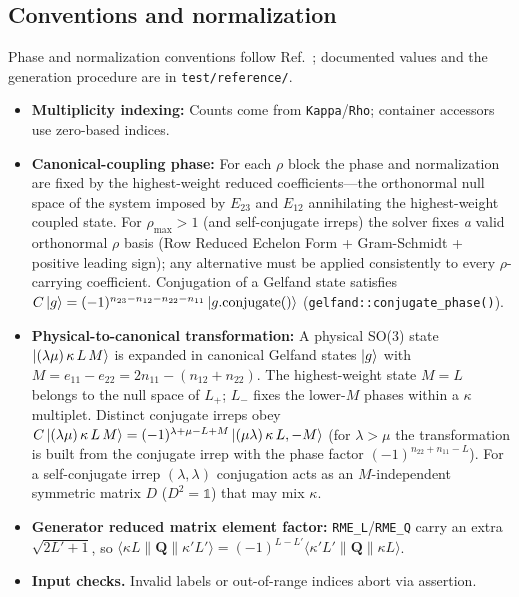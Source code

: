 \documentclass[aps,onecolumn,10pt,superscriptaddress,floatfix,nofootinbib]{revtex4}
\begin{document}
\subsection{Conventions and normalization}
\label{sub:conv}
Phase and normalization conventions follow Ref.~\cite{Dang2024EPJP1}; documented
values and the generation procedure are in \verb|test/reference/|.
\begin{itemize}
    \item \textbf{Multiplicity indexing:} Counts come from \verb|Kappa|/\verb|Rho|; container accessors use zero-based indices.%
    \item \textbf{Canonical-coupling phase:} For each $\rho$ block the phase and normalization are fixed by the highest-weight reduced coefficients---the orthonormal null space of the system imposed by $E_{23}$ and $E_{12}$ annihilating the highest-weight coupled state. For $\rho_{\max}>1$ (and self-conjugate irreps) the solver fixes \emph{a} valid orthonormal $\rho$ basis (Row Reduced Echelon Form + Gram-Schmidt + positive leading sign); any alternative must be applied consistently to every $\rho$-carrying coefficient. Conjugation of a Gelfand state satisfies $C\ket{g} = (-1)^{n_{23}-n_{12}-n_{22}-n_{11}}\ket{g.\mathrm{conjugate}()}$ (\verb|gelfand::conjugate_phase()|).
    \item \textbf{Physical-to-canonical transformation:} A physical SO(3) state $\ket{(\lambda\mu)\,\kappa\,L\,M}$ is expanded in canonical Gelfand states $\ket{g}$ with $M = e_{11} - e_{22} = 2n_{11} - (n_{12} + n_{22})$. The highest-weight state $M=L$ belongs to the null space of $L_+$; $L_-$ fixes the lower-$M$ phases within a $\kappa$ multiplet. Distinct conjugate irreps obey $C\ket{(\lambda\mu)\,\kappa\,L\,M} = (-1)^{\lambda+\mu-L+M}\ket{(\mu\lambda)\,\kappa\,L,-M}$ (for $\lambda>\mu$ the transformation is built from the conjugate irrep with the phase factor $(-1)^{n_{22}+n_{11}-L}$). For a self-conjugate irrep $(\lambda,\lambda)$ conjugation acts as an $M$-independent symmetric matrix $D$ ($D^2=\mathbb{1}$) that may mix $\kappa$.
    \item \textbf{Generator reduced matrix element factor:} \verb|RME_L|/\verb|RME_Q| carry an extra $\sqrt{2L'+1}$, so $\langle\kappa L\|\mathbf{Q}\|\kappa'L'\rangle=(-1)^{L-L'}\langle\kappa'L'\|\mathbf{Q}\|\kappa L\rangle$.
    \item \textbf{Input checks.} Invalid labels or out-of-range indices abort via assertion.
\end{itemize}
\end{document}
